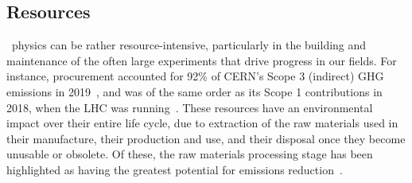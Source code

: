 \documentclass[../SustainableHEP.tex]{subfiles}
\begin{document}
\begin{reco2}{\currentname}
{\begin{itemize}[leftmargin=3.5 mm]
\end{itemize}
}
\end{reco2}


\subsection{Resources}
\label{subsec:Resources}

\ACR\ physics can be rather resource-intensive, particularly in the building and maintenance of the often large experiments that drive progress in our fields.  For instance, procurement accounted for 92\% of CERN's Scope 3 (indirect) GHG emissions in 2019~\cite{CERNTownHall}, and was of the same order as its Scope 1 contributions in 2018, when the LHC was running~\cite{Environment:2737239}.  These resources have an environmental impact over their entire life cycle, due to extraction of the raw materials used in their manufacture, their production and use, and their disposal once they become unusable or obsolete. Of these, the raw materials processing stage has been highlighted as having the greatest potential for emissions reduction~\cite{EURaw}.  
\end{document}
